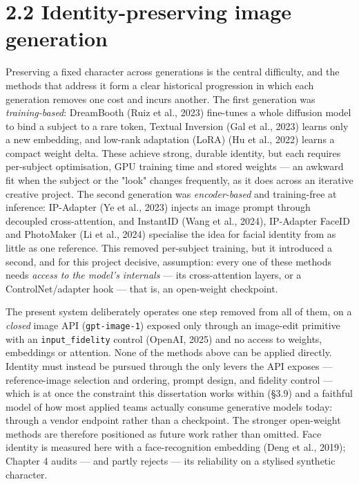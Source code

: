 \documentclass[10pt,twocolumn,letterpaper]{article}
\begin{document}

\section*{2.2 Identity-preserving image generation}

Preserving a fixed character across generations is the central difficulty, and the methods that address it form a clear historical progression in which each generation removes one cost and incurs another. The first generation was \emph{training-based}: DreamBooth (Ruiz et al., 2023) fine-tunes a whole diffusion model to bind a subject to a rare token, Textual Inversion (Gal et al., 2023) learns only a new embedding, and low-rank adaptation (LoRA) (Hu et al., 2022) learns a compact weight delta. These achieve strong, durable identity, but each requires per-subject optimisation, GPU training time and stored weights --- an awkward fit when the subject or the "look" changes frequently, as it does across an iterative creative project. The second generation was \emph{encoder-based} and training-free at inference: IP-Adapter (Ye et al., 2023) injects an image prompt through decoupled cross-attention, and InstantID (Wang et al., 2024), IP-Adapter FaceID and PhotoMaker (Li et al., 2024) specialise the idea for facial identity from as little as one reference. This removed per-subject training, but it introduced a second, and for this project decisive, assumption: every one of these methods needs \emph{access to the model's internals} --- its cross-attention layers, or a ControlNet/adapter hook --- that is, an open-weight checkpoint.

The present system deliberately operates one step removed from all of them, on a \emph{closed} image API (\texttt{gpt-image-1}) exposed only through an image-edit primitive with an \texttt{input\_fidelity} control (OpenAI, 2025) and no access to weights, embeddings or attention. None of the methods above can be applied directly. Identity must instead be pursued through the only levers the API exposes --- reference-image selection and ordering, prompt design, and fidelity control --- which is at once the constraint this dissertation works within (\S{}3.9) and a faithful model of how most applied teams actually consume generative models today: through a vendor endpoint rather than a checkpoint. The stronger open-weight methods are therefore positioned as future work rather than omitted. Face identity is measured here with a face-recognition embedding (Deng et al., 2019); Chapter 4 audits --- and partly rejects --- its reliability on a stylised synthetic character.
\end{document}
